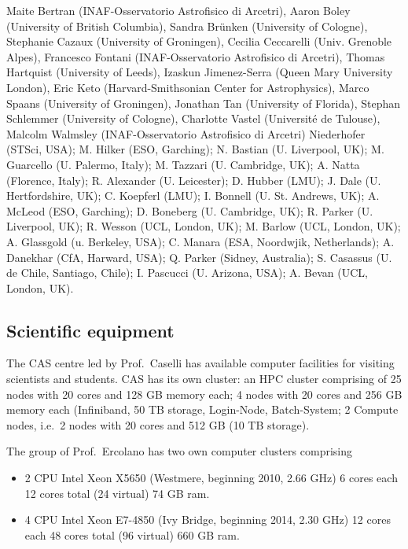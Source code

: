 \documentclass[10pt,fleqn,twoside]{article}
\begin{document}
Maite Bertran (INAF-Osservatorio Astrofisico di Arcetri), Aaron Boley (University of British Columbia), Sandra Brünken (University of Cologne), Stephanie Cazaux (University of Groningen), Cecilia Ceccarelli (Univ. Grenoble Alpes), Francesco Fontani (INAF-Osservatorio Astrofisico di Arcetri), Thomas Hartquist (University of Leeds), Izaskun Jimenez-Serra (Queen Mary University London), Eric Keto (Harvard-Smithsonian Center for Astrophysics), Marco Spaans (University of Groningen), Jonathan Tan (University of Florida), Stephan Schlemmer (University of Cologne), Charlotte Vastel (Université de Tulouse), Malcolm Walmsley (INAF-Osservatorio Astrofisico di Arcetri)
 Niederhofer (STSci, USA); M. Hilker (ESO, Garching); N. Bastian (U. Liverpool,
UK); M. Guarcello (U. Palermo, Italy); M. Tazzari (U. Cambridge, UK);
A. Natta (Florence, Italy); R. Alexander (U. Leicester); D. Hubber
(LMU); J. Dale (U. Hertfordshire, UK); C. Koepferl (LMU); I. Bonnell
(U. St. Andrews, UK); A. McLeod (ESO, Garching); D. Boneberg
(U. Cambridge, UK); R. Parker (U. Liverpool, UK); R. Wesson (UCL,
London, UK); M. Barlow (UCL, London, UK); A. Glassgold (u. Berkeley,
USA); C. Manara (ESA, Noordwjik, Netherlands); A. Danekhar (CfA,
Harward, USA); Q. Parker (Sidney, Australia); S. Casassus
(U. de Chile, Santiago, Chile); I. Pascucci (U. Arizona, USA);
A. Bevan (UCL, London, UK).

\subsection{Scientific equipment}

The CAS centre led by Prof.\ Caselli has available computer facilities for visiting scientists and students. CAS has its own cluster: an HPC cluster comprising of 25 nodes with 20 cores and 128 GB memory each; 4 nodes with 20 cores and 256 GB memory each (Infiniband, 50 TB storage, Login-Node, Batch-System; 2 Compute nodes, i.e.\ 2 nodes with 20 cores and 512 GB (10 TB storage). 


The group of Prof.\ Ercolano has two own computer clusters comprising 

\begin{itemize}
\item 2 CPU Intel Xeon X5650 (Westmere, beginning
2010, 2.66 GHz) 6 cores each 12 cores total (24 virtual) 74 GB ram.

\item 4 CPU Intel Xeon E7-4850 (Ivy Bridge, beginning 2014, 2.30 GHz)
12 cores each 48 cores total (96 virtual) 660 GB ram.

\end{itemize}
\end{document}
